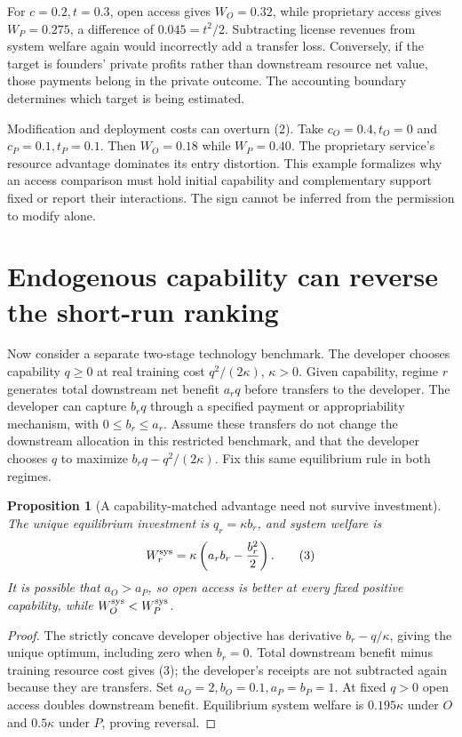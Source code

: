 \documentclass[11pt,a4paper]{article}
\newtheorem{proposition}[theorem]{Proposition}
\begin{document}
For $c=0.2,t=0.3$, open access gives $W_O=0.32$, while proprietary access gives $W_P=0.275$, a difference of $0.045=t^2/2$. Subtracting license revenues from system welfare again would incorrectly add a transfer loss. Conversely, if the target is founders' private profits rather than downstream resource net value, those payments belong in the private outcome. The accounting boundary determines which target is being estimated.

Modification and deployment costs can overturn (2). Take $c_O=0.4,t_O=0$ and $c_P=0.1,t_P=0.1$. Then $W_O=0.18$ while $W_P=0.40$. The proprietary service's resource advantage dominates its entry distortion. This example formalizes why an access comparison must hold initial capability and complementary support fixed or report their interactions. The sign cannot be inferred from the permission to modify alone.

\section{Endogenous capability can reverse the short-run ranking}
Now consider a separate two-stage technology benchmark. The developer chooses capability $q\ge0$ at real training cost $q^2/(2\kappa)$, $\kappa>0$. Given capability, regime $r$ generates total downstream net benefit $a_rq$ before transfers to the developer. The developer can capture $b_rq$ through a specified payment or appropriability mechanism, with $0\le b_r\le a_r$. Assume these transfers do not change the downstream allocation in this restricted benchmark, and that the developer chooses $q$ to maximize $b_rq-q^2/(2\kappa)$. Fix this same equilibrium rule in both regimes.

\begin{proposition}[A capability-matched advantage need not survive investment]
The unique equilibrium investment is $q_r=\kappa b_r$, and system welfare is
\[
 W_r^{\rm sys}=\kappa\left(a_rb_r-\frac{b_r^2}{2}\right). \tag{3}
\]
It is possible that $a_O>a_P$, so open access is better at every fixed positive capability, while $W_O^{\rm sys}<W_P^{\rm sys}$.
\end{proposition}
\begin{proof}
The strictly concave developer objective has derivative $b_r-q/\kappa$, giving the unique optimum, including zero when $b_r=0$. Total downstream benefit minus training resource cost gives (3); the developer's receipts are not subtracted again because they are transfers. Set $a_O=2,b_O=0.1,a_P=b_P=1$. At fixed $q>0$ open access doubles downstream benefit. Equilibrium system welfare is $0.195\kappa$ under $O$ and $0.5\kappa$ under $P$, proving reversal.
\end{proof}
\end{document}
